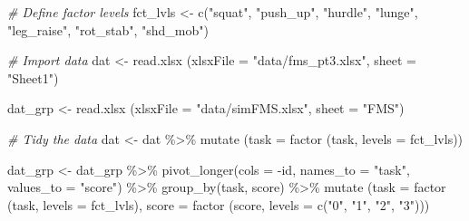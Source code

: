 \documentclass[
]{book}
\newenvironment{Shaded}{\begin{snugshade}}{\end{snugshade}}
\newcommand{\AttributeTok}[1]{\textcolor[rgb]{0.77,0.63,0.00}{#1}}
\newcommand{\CommentTok}[1]{\textcolor[rgb]{0.56,0.35,0.01}{\textit{#1}}}
\newcommand{\FunctionTok}[1]{\textcolor[rgb]{0.00,0.00,0.00}{#1}}
\newcommand{\NormalTok}[1]{#1}
\newcommand{\OtherTok}[1]{\textcolor[rgb]{0.56,0.35,0.01}{#1}}
\newcommand{\SpecialCharTok}[1]{\textcolor[rgb]{0.00,0.00,0.00}{#1}}
\newcommand{\StringTok}[1]{\textcolor[rgb]{0.31,0.60,0.02}{#1}}
\begin{document}
\begin{Shaded}
\begin{Highlighting}[]
\CommentTok{\# Define factor levels}
\NormalTok{fct\_lvls }\OtherTok{\textless{}{-}} \FunctionTok{c}\NormalTok{(}\StringTok{"squat"}\NormalTok{, }\StringTok{"push\_up"}\NormalTok{, }\StringTok{"hurdle"}\NormalTok{, }\StringTok{"lunge"}\NormalTok{, }\StringTok{"leg\_raise"}\NormalTok{, }\StringTok{"rot\_stab"}\NormalTok{, }\StringTok{"shd\_mob"}\NormalTok{)}

\CommentTok{\# Import data}
\NormalTok{dat }\OtherTok{\textless{}{-}}  \FunctionTok{read.xlsx}\NormalTok{ (}\AttributeTok{xlsxFile =} \StringTok{"data/fms\_pt3.xlsx"}\NormalTok{,}
                   \AttributeTok{sheet =} \StringTok{"Sheet1"}\NormalTok{)}

\NormalTok{dat\_grp }\OtherTok{\textless{}{-}}  \FunctionTok{read.xlsx}\NormalTok{ (}\AttributeTok{xlsxFile =} \StringTok{"data/simFMS.xlsx"}\NormalTok{,}
                   \AttributeTok{sheet =} \StringTok{"FMS"}\NormalTok{)}


\CommentTok{\# Tidy the data}
\NormalTok{dat }\OtherTok{\textless{}{-}}\NormalTok{ dat }\SpecialCharTok{\%\textgreater{}\%}
  \FunctionTok{mutate}\NormalTok{ (}\AttributeTok{task =} \FunctionTok{factor}\NormalTok{ (task, }\AttributeTok{levels =}\NormalTok{ fct\_lvls))}

\NormalTok{dat\_grp }\OtherTok{\textless{}{-}}\NormalTok{  dat\_grp }\SpecialCharTok{\%\textgreater{}\%}
  \FunctionTok{pivot\_longer}\NormalTok{(}\AttributeTok{cols =} \SpecialCharTok{{-}}\NormalTok{id,}
               \AttributeTok{names\_to =} \StringTok{"task"}\NormalTok{,}
               \AttributeTok{values\_to =} \StringTok{"score"}\NormalTok{) }\SpecialCharTok{\%\textgreater{}\%}
  \FunctionTok{group\_by}\NormalTok{(task, score) }\SpecialCharTok{\%\textgreater{}\%}
  \FunctionTok{mutate}\NormalTok{ (}\AttributeTok{task =} \FunctionTok{factor}\NormalTok{ (task, }\AttributeTok{levels =}\NormalTok{ fct\_lvls),}
          \AttributeTok{score =} \FunctionTok{factor}\NormalTok{ (score, }\AttributeTok{levels =} \FunctionTok{c}\NormalTok{(}\StringTok{"0"}\NormalTok{, }\StringTok{"1"}\NormalTok{, }\StringTok{"2"}\NormalTok{, }\StringTok{"3"}\NormalTok{)))}
  
\end{Highlighting}
\end{Shaded}
\end{document}
